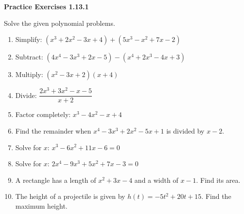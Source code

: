 \vspace{0.3ex}
\noindent\textbf{Practice Exercises 1.13.1}

\vspace{0.2ex}

Solve the given polynomial problems.
\begin{enumerate}
    \item Simplify: $(x^3 + 2x^2 - 3x + 4) + (5x^3 - x^2 + 7x - 2)$
    \item Subtract: $(4x^4 - 3x^3 + 2x - 5) - (x^4 + 2x^3 - 4x + 3)$
    \item Multiply: $(x^2 - 3x + 2)(x + 4)$
    \item Divide: $\dfrac{2x^3 + 3x^2 - x - 5}{x + 2}$
    \item Factor completely: $x^3 - 4x^2 - x + 4$
    \item Find the remainder when $x^4 - 3x^3 + 2x^2 - 5x + 1$ is divided by $x - 2$.
    \item Solve for $x$: $x^3 - 6x^2 + 11x - 6 = 0$
    \item Solve for $x$: $2x^4 - 9x^3 + 5x^2 + 7x - 3 = 0$
    \item A rectangle has a length of $x^2 + 3x - 4$ and a width of $x - 1$. Find its area.
    \item The height of a projectile is given by $h(t) = -5t^2 + 20t + 15$. Find the maximum height.
\end{enumerate}